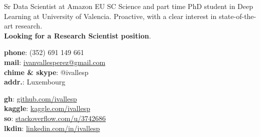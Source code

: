 \documentclass{resume} %
\begin{document}
\noindent

\printname
\vspace{5pt}

\begin{minipage}[t]{.38\textwidth}
	\raggedright


Sr Data Scientist at Amazon EU SC Science and part time PhD student in Deep Learning at University of Valencia. Proactive, with a clear interest in state-of-the-art research.\\ \textbf{Looking for a Research Scientist position}.
\end{minipage}\hspace{.05\textwidth}
\begin{minipage}[t]{.27\textwidth}
	\raggedright
	{\textbf{phone}: (352) 691 149 661 \\
	\textbf{mail}: \href{mailto:ivanvallesperez@gmail.com}{ivanvallesperez@gmail.com}\\
	\textbf{chime \& skype}: @ivallesp \\
	\textbf{addr.}: Luxembourg
}
\end{minipage}\hspace{.03\textwidth}
\begin{minipage}[t]{.27\textwidth}
	\raggedright
	{ \textbf{gh}: \href{https://www.github.com/ivallesp}{github.com/ivallesp}  \\
	  \textbf{kaggle}: \href{https://www.kaggle.com/ivallesp}{kaggle.com/ivallesp}  \\
	  \textbf{so}: \href{https://stackoverflow.com/users/3742686/ivallesp}{stackoverflow.com/u/3742686} \\
	  \textbf{lkdin}: \href{https://www.linkedin.com/in/ivallesp}{linkedin.com/in/ivallesp}
	}
\end{minipage}


\end{document}
